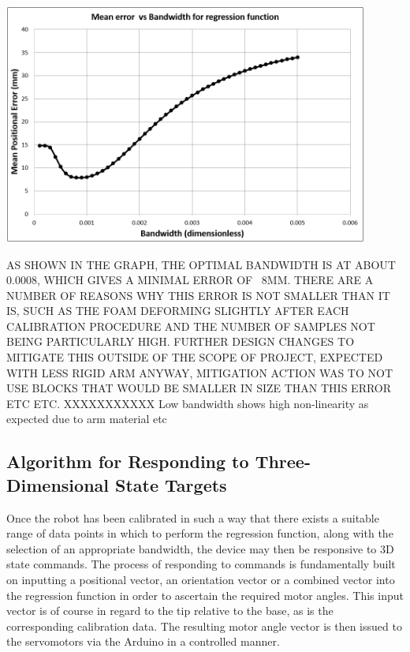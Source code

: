 \documentclass[11pt]{article}
\begin{document}
\begin{center}
\includegraphics[width=0.9\textwidth]{images/bandwidthPlot.png}
\label{figure:bandwidthPlot}
\end{center}

AS SHOWN IN THE GRAPH, THE OPTIMAL BANDWIDTH IS AT ABOUT 0.0008, WHICH GIVES A MINIMAL ERROR OF ~8MM. THERE ARE A NUMBER OF REASONS WHY THIS ERROR IS NOT SMALLER THAN IT IS, SUCH AS THE FOAM DEFORMING SLIGHTLY AFTER EACH CALIBRATION PROCEDURE AND THE NUMBER OF SAMPLES NOT BEING PARTICULARLY HIGH. FURTHER DESIGN CHANGES TO MITIGATE THIS OUTSIDE OF THE SCOPE OF PROJECT, EXPECTED WITH LESS RIGID ARM ANYWAY, MITIGATION ACTION WAS TO NOT USE BLOCKS THAT WOULD BE SMALLER IN SIZE THAN THIS ERROR ETC ETC. XXXXXXXXXXX
Low bandwidth shows high non-linearity as expected due to arm material etc




\pagebreak 
\subsection{Algorithm for Responding to Three-Dimensional State Targets}
Once the robot has been calibrated in such a way that there exists a suitable range of data points in which to perform the regression function, along with the selection of an appropriate bandwidth, the device may then be responsive to 3D state commands.
The process of responding to commands is fundamentally built on inputting a positional vector, an orientation vector or a combined vector into the regression function in order to ascertain the required motor angles. This input vector is of course in regard to the tip relative to the base, as is the corresponding calibration data. The resulting motor angle vector is then issued to the servomotors via the Arduino in a controlled manner. 
\end{document}

